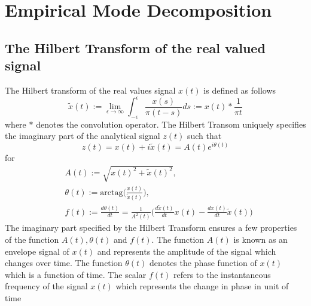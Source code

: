 \documentclass[article,moreauthors,pdftex,10pt,a4paper]{ssrn}
\begin{document}

\section{Empirical Mode Decomposition}

\subsection{The Hilbert Transform of the real valued signal }
The Hilbert transform of the real values  signal $x(t)$ is defined as follows
\begin{equation}
\tilde{x}(t) := \lim_{\epsilon \rightarrow \infty}\int_{-\epsilon}^{\epsilon} \frac{x(s)}{\pi (t-s)} ds := x(t) * \frac{1}{\pi t }
\end{equation}
where $*$ denotes the convolution operator. The Hilbert Transom uniquely specifies the imaginary part of the analytical signal $z(t)$ such that
\begin{equation}
z(t) = x(t) + i \tilde{x}(t) = A(t)  e^{i \theta(t)}
\end{equation}
for 
\begin{align*}
& A(t) :=  \sqrt{x(t)^2 + \tilde{x}(t)^2 },\\
& \theta(t) := \text{arctag} \Big( \frac{x(t)}{\tilde{x}(t)}\Big), \\
& f(t) := \frac{d\theta(t)}{dt} = \frac{1}{A^2(t)}\Big( \frac{d \tilde{x}(t)}{dt} x(t) - \frac{d x(t)}{dt} \tilde{x}(t) \Big)
\end{align*}
The imaginary part specified by the Hilbert Transform ensures a few properties of the function $A(t), \theta(t)$ and $f(t)$. The function $A(t)$ is known as an envelope signal of $x(t)$ and represents the amplitude of the signal which changes over time.  The function $\theta(t)$ denotes the phase function of $x(t)$ which is a function of time. The scalar $f(t)$ refers to the instantaneous frequency of the signal $x(t)$ which represents the change in phase in unit of time
\end{document}
